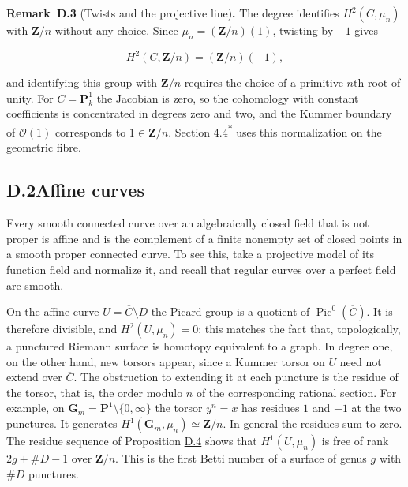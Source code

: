 \documentclass[11pt]{article}
\newenvironment{bpstatement}[2]{\par\addvspace{0.6\baselineskip}\noindent\textbf{#1}#2\textbf{.}\enspace\ignorespaces}
  {\par\addvspace{0.4\baselineskip}}
\newcommand{\bpout}[1]{#1\textsuperscript{\hyperlink{bp-outside}{\ensuremath{\ast}}}}
\begin{document}
\label{bp181}%
\begin{bpstatement}{Remark~D.3}{ (Twists and the projective line)}
The degree identifies \(H^2(C,\mu_n)\) with \(\mathbf Z/n\) without any choice. Since \(\mu_n=(\mathbf Z/n)(1)\), twisting by \(-1\) gives

\[
H^2(C,\mathbf Z/n)=(\mathbf Z/n)(-1),
\]

and identifying this group with \(\mathbf Z/n\) requires the choice of a primitive \(n\)th root of unity.  For \(C=\mathbf P^1_k\) the Jacobian is zero, so the cohomology with constant coefficients is concentrated in degrees zero and two, and the Kummer boundary of \(\mathcal O(1)\) corresponds to \(1\in\mathbf Z/n\). Section \bpout{4.4} uses this normalization on the geometric fibre.
\end{bpstatement}


\subsection*{\texorpdfstring{D.2\quad Affine curves}{D.2 Affine curves}}
\label{bp182}%
\label{bp183}%
Every smooth connected curve over an algebraically closed field that is not proper is affine and is the complement of a finite nonempty set of closed points in a smooth proper connected curve.  To see this, take a projective model of its function field and normalize it, and recall that regular curves over a perfect field are smooth.

On the affine curve \(U=\overline C\setminus D\) the Picard group is a quotient of \(\operatorname{Pic}^0(\overline C)\). It is therefore divisible, and \(H^2(U,\mu_n)=0\); this matches the fact that, topologically, a punctured Riemann surface is homotopy equivalent to a graph. In degree one, on the other hand, new torsors appear, since a Kummer torsor on \(U\) need not extend over \(\overline C\). The obstruction to extending it at each puncture is the residue of the torsor, that is, the order modulo \(n\) of the corresponding rational section. For example, on \(\mathbf G_m=\mathbf P^1\setminus\{0,\infty\}\) the torsor \(y^n=x\) has residues \(1\) and \(-1\) at the two punctures. It generates \(H^1(\mathbf G_m,\mu_n)\simeq\mathbf Z/n\). In general the residues sum to zero. The residue sequence of Proposition \hyperref[bp184]{D.4} shows that \(H^1(U,\mu_n)\) is free of rank \(2g+\#D-1\) over \(\mathbf Z/n\). This is the first Betti number of a surface of genus \(g\) with \(\#D\) punctures.
\end{document}
